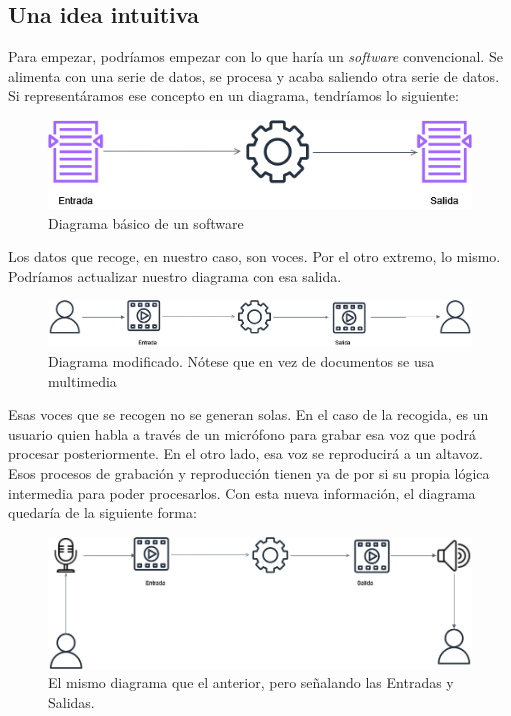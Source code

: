 \subsection{Una idea intuitiva}
Para empezar, podríamos empezar con lo que haría un \textit{software} convencional. Se alimenta con una serie de datos, se procesa y acaba saliendo otra serie de datos. Si representáramos ese concepto en un diagrama, tendríamos lo siguiente:

\begin{figure}[H]
	\centering
	\includegraphics[width=\textwidth]{imagenes/DiagramaBase.png}
	\caption{Diagrama básico de un software}
\end{figure}

Los datos que recoge, en nuestro caso, son voces. Por el otro extremo, lo mismo. Podríamos actualizar nuestro diagrama con esa salida.

\begin{figure}[H]
	\centering
	\includegraphics[width=1.1\textwidth]{imagenes/DiagramaDatos.png}
	\caption[Diagrama modificado.]{Diagrama modificado. Nótese que en vez de documentos se usa multimedia}
\end{figure}

Esas voces que se recogen no se generan solas. En el caso de la recogida, es un usuario quien habla a través de un micrófono para grabar esa voz que podrá procesar posteriormente. En el otro lado, esa voz se reproducirá a un altavoz. Esos procesos de grabación y reproducción tienen ya de por si su propia lógica intermedia para poder procesarlos. Con esta nueva información, el diagrama quedaría de la siguiente forma:

\begin{figure}[H]
	\centering
	\includegraphics[width=1.1\textwidth]{imagenes/DiagramaIO.png}
	\caption[Diagrama con E/S.]{El mismo diagrama que el anterior, pero señalando las Entradas y Salidas.}
\end{figure}

